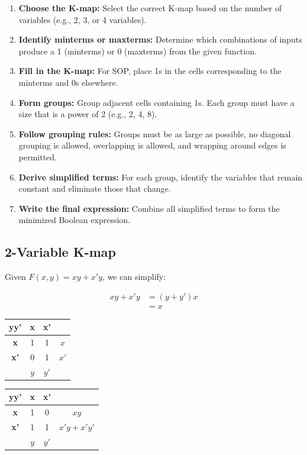 \begin{enumerate}
    \item \textbf{Choose the K-map:} Select the correct K-map based on the 
    number of variables (e.g., 2, 3, or 4 variables).
    
    \item \textbf{Identify minterms or maxterms:} Determine which combinations of 
    inputs produce a 1 (minterms) or 0 (maxterms) from the given function.
    
    \item \textbf{Fill in the K-map:} For SOP, place 1s in the cells 
    corresponding to the minterms and 0s elsewhere.
    
    \item \textbf{Form groups:} Group adjacent cells containing 1s. Each group 
    must have a size that is a power of 2 (e.g., 2, 4, 8).
    
    \item \textbf{Follow grouping rules:} Groups must be as large as possible, 
    no diagonal grouping is allowed, overlapping is allowed, and wrapping around 
    edges is permitted.
    
    \item \textbf{Derive simplified terms:} For each group, identify the 
    variables that remain constant and eliminate those that change.
    
    \item \textbf{Write the final expression:} Combine all simplified terms to 
    form the minimized Boolean expression.
\end{enumerate}

\subsection{2-Variable K-map}

Given $F(x,y) = xy + x'y$, we can simplify:

\begin{align*}
    xy + x'y &= (y + y')x \\
             &= x
\end{align*}

\begin{center}
\begin{tabular}{c|cc|c}
    \textbf{yy'} & \textbf{x} & \textbf{x'} & \\
    \hline
    \textbf{x}     & 1 & 1 & $x$ \\
    \textbf{x'}    & 0 & 1 & $x'$ \\
    \hline
               & $y$ & $y'$ & 
\end{tabular}
\qquad
\begin{tabular}{c|cc|c}
    \textbf{yy'} & \textbf{x} & \textbf{x'} & \\
    \hline
    \textbf{x}     & 1 & 0 & $xy$ \\
    \textbf{x'}    & 1 & 1 & $x'y + x'y'$ \\
    \hline
               & $y$ & $y'$ & 
\end{tabular}
\end{center}

